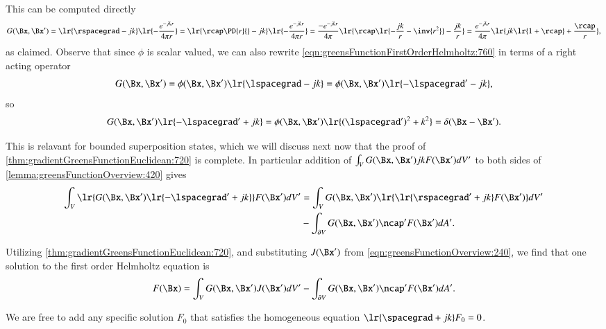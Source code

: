 This can be computed directly
\begin{dmath}\label{eqn:greensFunctionFirstOrderHelmholtz:780}
G(\Bx, \Bx')
=
\lr{ \rspacegrad - j k } \lr{ -\frac{e^{-j k r}}{4 \pi r} }
=
\lr{ \rcap \PD{r}{} -j k } \lr{ -\frac{e^{-j k r}}{4 \pi r} }
=
\frac{-e^{-j k r}}{4 \pi}
\lr{
\rcap \lr{ -\frac{j k}{r} - \inv{ r^2 } } - \frac{j k}{r}
}
=
\frac{e^{-j k r}}{4 \pi}
\lr{
j k \lr{ 1 + \rcap } + \frac{\rcap}{r}
},
\end{dmath}
as claimed.
Observe that since \( \phi \) is scalar valued, we can also rewrite
\cref{eqn:greensFunctionFirstOrderHelmholtz:760} in terms of a right acting operator
\begin{dmath}\label{eqn:greensFunctionFirstOrderHelmholtz:800}
G(\Bx, \Bx')
=
\phi(\Bx, \Bx')
\lr{ \lspacegrad - j k }
=
\phi(\Bx, \Bx')
\lr{ -\lspacegrad' - j k },
\end{dmath}
so
\begin{equation}\label{eqn:greensFunctionFirstOrderHelmholtz:820}
G(\Bx, \Bx') \lr{ -\lspacegrad' + j k } =
\phi(\Bx, \Bx') \lr{ (\lspacegrad')^2 + k^2 }
=
\delta(\Bx - \Bx').
\end{equation}

This is relavant for bounded superposition states, which we will discuss next now that the proof of
\cref{thm:gradientGreensFunctionEuclidean:720} is complete.
In particular addition of
\( \int_V G(\Bx, \Bx') j k F(\Bx') dV' \) to both sides of \cref{lemma:greensFunctionOverview:420} gives
\begin{dmath}\label{eqn:greensFunctionFirstOrderHelmholtz:860}
\begin{aligned}
\int_V \lr{ G(\Bx, \Bx') \lr{ -\lspacegrad' + j k } } F(\Bx') dV'
&=
\int_V G(\Bx, \Bx') \lr{ \lr{ \rspacegrad' + j k } F(\Bx') } dV' \\
&-
\int_{\partial V} G(\Bx, \Bx') \ncap' F(\Bx') dA'.
\end{aligned}
\end{dmath}

Utilizing \cref{thm:gradientGreensFunctionEuclidean:720}, and substituting \( J(\Bx') \)
from \cref{eqn:greensFunctionOverview:240},
we find that one solution to the first order Helmholtz equation is
\begin{dmath}\label{eqn:greensFunctionFirstOrderHelmholtz:880}
F(\Bx)
=
\int_V G(\Bx, \Bx') J(\Bx') dV'
-
\int_{\partial V} G(\Bx, \Bx') \ncap' F(\Bx') dA'.
\end{dmath}

We are free to
add any specific solution \( F_0 \) that satisfies the homogeneous equation \( \lr{ \spacegrad + j k } F_0 = 0 \).
